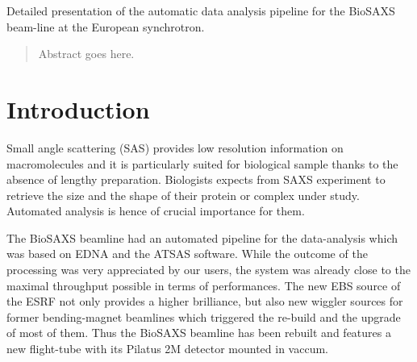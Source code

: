 \documentclass[preprint]{iucr}              %
\begin{document}

\maketitle                        %

\begin{synopsis}
Detailed presentation of the automatic data analysis pipeline for the BioSAXS beam-line at the European synchrotron.  
\end{synopsis}

\begin{abstract}
Abstract goes here.
\end{abstract}



\section{Introduction}
Small angle scattering (SAS) provides low resolution information on macromolecules and it is  
particularly suited for biological sample thanks to the absence of lengthy preparation. 
Biologists expects from SAXS experiment to retrieve the size and the shape of their protein or complex under study.
Automated analysis is hence of crucial importance for them.

The BioSAXS\cite{BM29paper} beamline had an automated pipeline for the data-analysis which was based on EDNA\cite{EDNA} and the ATSAS\cite{ATSAS}
software. 
While the outcome of the processing was very appreciated by our users, the system was already close to the maximal throughput possible in terms of performances. 
The new EBS source \cite{EBS} of the ESRF not only provides a higher brilliance, but also new wiggler sources for former bending-magnet beamlines which triggered the re-build and the upgrade of most of them. 
Thus the BioSAXS beamline has been rebuilt and features a new flight-tube with its Pilatus 2M detector mounted in vaccum. 
\end{document}
